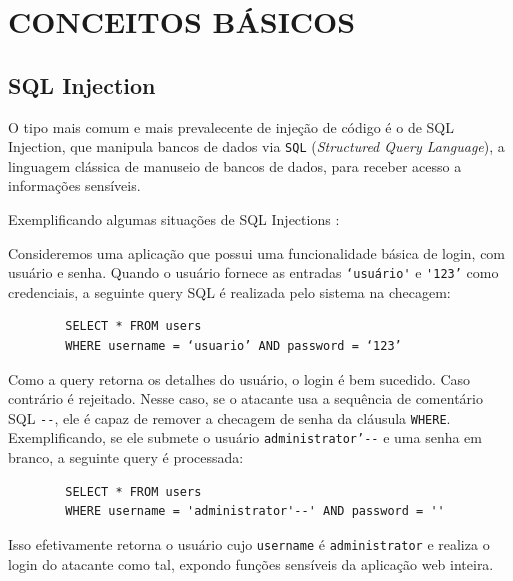 \chapter{CONCEITOS BÁSICOS\textbf{}}
\label{chp:capitulo2}

\section{SQL Injection}


O tipo mais comum e mais prevalecente de injeção de código é o de SQL Injection, que manipula bancos de dados via \verb+SQL+ (\textit{Structured Query Language}), a linguagem clássica de manuseio de bancos de dados, para receber acesso a informações sensíveis.

Exemplificando algumas situações de SQL Injections \cite{sql_port_swigger}:

\begin{alineas}
    \item 
    Consideremos uma aplicação que possui uma funcionalidade básica de login, com usuário e senha. Quando o usuário fornece as entradas \verb+‘usuário'+ e \verb+'123’+ como credenciais, a seguinte query SQL é realizada pelo sistema na checagem:
    
    \begin{verbatim}
        SELECT * FROM users 
        WHERE username = ‘usuario’ AND password = ‘123’
    \end{verbatim}
    
    Como a query retorna os detalhes do usuário, o login é bem sucedido. Caso contrário  é rejeitado. Nesse caso, se o atacante usa a sequência de comentário SQL \verb+--+, ele é capaz de remover a checagem de senha da cláusula \verb+WHERE+. Exemplificando, se ele submete o usuário \verb+administrator’--+ e uma senha em branco, a seguinte query é processada:
    
    \begin{verbatim}
        SELECT * FROM users 
        WHERE username = 'administrator'--' AND password = '' 
    \end{verbatim}
    
    Isso efetivamente retorna o usuário cujo \verb+username+ é \verb+administrator+ e realiza o login do atacante como tal, expondo funções sensíveis da aplicação web inteira.

\end{alineas}

